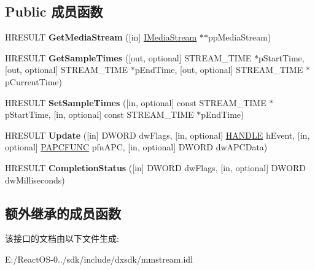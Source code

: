 \subsection*{Public 成员函数}
\begin{DoxyCompactItemize}
\item 
\mbox{\label{interface_i_stream_sample_a969b4610d5b3998887897ef17dbc9ac5}} 
H\+R\+E\+S\+U\+LT {\bfseries Get\+Media\+Stream} (\mbox{[}in\mbox{]} \hyperlink{interface_i_media_stream}{I\+Media\+Stream} $\ast$$\ast$pp\+Media\+Stream)
\item 
\mbox{\label{interface_i_stream_sample_a4ceb5fa7a93249e46723955925bc7e90}} 
H\+R\+E\+S\+U\+LT {\bfseries Get\+Sample\+Times} (\mbox{[}out, optional\mbox{]} S\+T\+R\+E\+A\+M\+\_\+\+T\+I\+ME $\ast$p\+Start\+Time, \mbox{[}out, optional\mbox{]} S\+T\+R\+E\+A\+M\+\_\+\+T\+I\+ME $\ast$p\+End\+Time, \mbox{[}out, optional\mbox{]} S\+T\+R\+E\+A\+M\+\_\+\+T\+I\+ME $\ast$p\+Current\+Time)
\item 
\mbox{\label{interface_i_stream_sample_a05b4494674e1cab8ae188cf4c0b13c2c}} 
H\+R\+E\+S\+U\+LT {\bfseries Set\+Sample\+Times} (\mbox{[}in, optional\mbox{]} const S\+T\+R\+E\+A\+M\+\_\+\+T\+I\+ME $\ast$p\+Start\+Time, \mbox{[}in, optional\mbox{]} const S\+T\+R\+E\+A\+M\+\_\+\+T\+I\+ME $\ast$p\+End\+Time)
\item 
\mbox{\label{interface_i_stream_sample_adca5822c9fa35bf4b7f3b368a42fea05}} 
H\+R\+E\+S\+U\+LT {\bfseries Update} (\mbox{[}in\mbox{]} D\+W\+O\+RD dw\+Flags, \mbox{[}in, optional\mbox{]} \hyperlink{interfacevoid}{H\+A\+N\+D\+LE} h\+Event, \mbox{[}in, optional\mbox{]} \hyperlink{interfacevoid}{P\+A\+P\+C\+F\+U\+NC} pfn\+A\+PC, \mbox{[}in, optional\mbox{]} D\+W\+O\+RD dw\+A\+P\+C\+Data)
\item 
\mbox{\label{interface_i_stream_sample_a16cf67a373eb6a82c4f0f23125494ef1}} 
H\+R\+E\+S\+U\+LT {\bfseries Completion\+Status} (\mbox{[}in\mbox{]} D\+W\+O\+RD dw\+Flags, \mbox{[}in, optional\mbox{]} D\+W\+O\+RD dw\+Milliseconds)
\end{DoxyCompactItemize}
\subsection*{额外继承的成员函数}


该接口的文档由以下文件生成\+:\begin{DoxyCompactItemize}
\item 
E\+:/\+React\+O\+S-\/0../sdk/include/dxsdk/mmstream.\+idl\end{DoxyCompactItemize}
